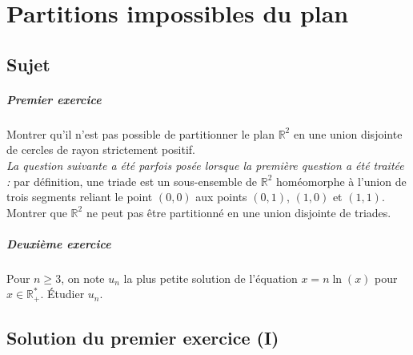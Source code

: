 \chapter{Partitions impossibles du plan}

\section{Sujet}

\paragraph{Premier exercice}
Montrer qu'il n'est pas possible de partitionner le plan $\mathbb{R}^2 $ en une union disjointe de cercles de rayon strictement positif.\\
\emph{La question suivante a été parfois posée lorsque la première question a été traitée :} par définition, une triade est un sous-ensemble de $\mathbb{R}^2 $ homéomorphe à l'union de trois segments reliant le point $(0, 0)$ aux points $(0, 1)$, $(1, 0)$ et $(1, 1)$. Montrer que $\mathbb{R}^2 $ ne peut pas être partitionné en une union disjointe de triades.

\paragraph{Deuxième exercice}
Pour $n \geqslant 3$, on note $u_n$ la plus petite solution de l'équation $x = n \ln(x)$ pour $x \in \mathbb R_+^*$. Étudier $u_n$.

\section{Solution du premier exercice (I)} %

